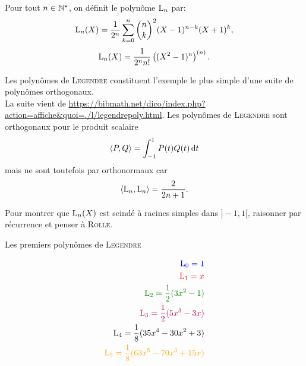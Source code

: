 \begin{defi}
    Pour tout $n \in \mathbb{N}^\star$, on définit le polynôme $\mathrm{L}_n$ par:
    $$\mathrm{L}_n(X) = \frac{1}{2^n} \sum_{k=0}^{n} \binom{n}{k}^2 (X-1)^{n-k}(X+1)^{k},$$
    $$\mathrm{L}_n(X) = \frac{1}{2^n n!} \left( (X^2-1)^n \right)^{(n)}.$$
\end{defi}

Les polynômes de \textsc{Legendre} constituent l'exemple le plus simple d'une suite de polynômes orthogonaux. \\
La suite vient de \url{https://bibmath.net/dico/index.php?action=affiche&quoi=./l/legendrepoly.html}.
Les polynômes de \textsc{Legendre} sont orthogonaux pour le produit scalaire
$$\langle P, Q \rangle = \int_{-1}^1 P(t) Q(t) \, \mathrm{d} t$$
mais ne sont toutefois par orthonormaux car
$$\langle \mathrm{L}_n, \mathrm{L}_n \rangle = \frac{2}{2n+1}.$$

\begin{elem_sol}
    Pour montrer que $\mathrm{L}_n(X)$ est scindé à racines simples dans $]-1, 1[$, raisonner par récurrence et penser à \textsc{Rolle}. 
\end{elem_sol}

\begin{marginfigure}[-11.5cm]
    \centering
	
	\caption*{\centering Les premiers polynômes de \textsc{Legendre}}
	\small
	\begin{align*}
	    \color{blue} \Leg_0 = 1 \\
	    \color{red} \Leg_1 = x \\
	    \color{green} \Leg_2 = \frac{1}{2}(3x^2-1) \\
	    \color{purple} \Leg_3 = \frac{1}{2}(5x^3-3x) \\
	    \color{black} \Leg_4 = \frac{1}{8}(35x^4-30x^2+3) \\
	    \color{orange} \Leg_5 = \frac{1}{8}(63x^5-70x^3+15x)
	\end{align*}
\end{marginfigure}

